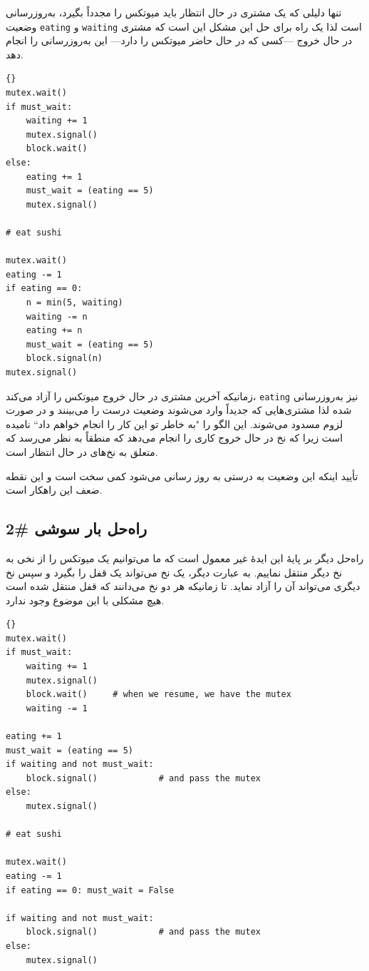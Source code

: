 \documentclass{book}
\newcommand{\clearemptydoublepage}{\newpage\cleardoublepage}
\begin{document}
    تنها دلیلی که یک مشتری در حال انتظار باید میوتکس را مجدداً بگیرد، به‌روزرسانی وضعیت  {\tt eating} و {\tt waiting} است لذا 
    یک راه برای حل این مشکل این است که مشتری  در حال خروج ---کسی که در حال حاضر میوتکس را دارد--- این به‌روزرسانی را انجام دهد. 

\begin{latin}
\begin{lstlisting}[title=\rl{راه‌حل بار سوشی  \#1}]{}
mutex.wait()
if must_wait:
    waiting += 1
    mutex.signal()
    block.wait()
else:
    eating += 1
    must_wait = (eating == 5)
    mutex.signal()

# eat sushi

mutex.wait()
eating -= 1
if eating == 0:
    n = min(5, waiting)
    waiting -= n
    eating += n
    must_wait = (eating == 5)
    block.signal(n)
mutex.signal()
\end{lstlisting}
\end{latin}

    زمانیکه آخرین مشتری در حال خروج میوتکس را آزاد می‌کند، {\tt eating} نیز به‌روزرسانی شده لذا مشتری‌هایی که جدیداً وارد می‌شوند وضعیت درست 
    را می‌بینند و در صورت لزوم مسدود می‌شوند.  این الگو را ‍‍"به خاطر تو این کار را انجام خواهم داد`` 
    نامیده است زیرا که نخ در حال خروج کاری را انجام می‌دهد که منطقاً به نظر می‌رسد که متعلق به نخ‌های در حال انتظار است. 

    تأیید اینکه این وضعیت به درستی به روز رسانی می‌شود کمی سخت است و این نقطه ضعف این راهکار است. 


\clearemptydoublepage
\subsection{راه‌حل بار سوشی  \#2}

     راه‌حل دیگر  بر پایهٔ این ایدهٔ غیر معمول است که ما می‌توانیم یک میوتکس را از نخی به نخ دیگر منتقل نماییم. 
     به عبارت دیگر، یک نخ می‌تواند یک قفل را بگیرد و سپس نخ دیگری می‌تواند آن را آزاد نماید. تا زمانیکه هر دو نخ می‌دانند که قفل منتقل شده است 
     هیچ مشکلی با این موضوع وجود ندارد. 

\begin{latin}
\begin{lstlisting}[title=\rl{راه‌حل بار سوشی  \#2}]{}
mutex.wait()
if must_wait:
    waiting += 1
    mutex.signal()
    block.wait()     # when we resume, we have the mutex
    waiting -= 1

eating += 1
must_wait = (eating == 5)
if waiting and not must_wait:
    block.signal()            # and pass the mutex
else:
    mutex.signal()

# eat sushi

mutex.wait()
eating -= 1
if eating == 0: must_wait = False

if waiting and not must_wait:
    block.signal()            # and pass the mutex
else:
    mutex.signal()
\end{lstlisting}
\end{latin}
\end{document}
